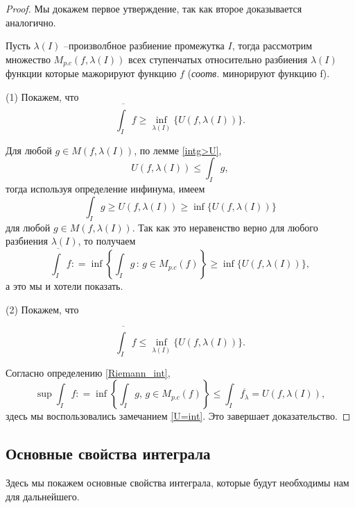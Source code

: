 \begin{proof} Мы докажем первое утверждение, так как второе доказывается аналогично.

Пусть $\lambda(I)$ --произволбное разбиение промежутка $I$, тогда рассмотрим множество $M_{p.c}(f, \lambda(I))$ всех ступенчатых относительно разбиения $\lambda(I)$ функции которые мажорируют функцию $f$ (\textit{соотв.} минорируют функцию f).

(1) Покажем, что 
\[
 \overline{\int_I} f \ge \inf_{\lambda(I)} \{U(f, \lambda(I))\}.
\]

Для любой $g\in M(f, \lambda(I))$, по лемме \ref{intg>U}, 
 \[
   U(f, \lambda(I)) \le \int_I g,
 \]
тогда используя определение инфинума, имеем
\[
 \int_I g \ge U(f,\lambda(I)) \ge \inf\{U(f,\lambda(I))\}
\]
для любой $g\in M(f, \lambda(I))$. Так как это неравенство верно для любого разбиения $\lambda(I)$, то получаем
\[
\overline{\int_I} f: = \inf \left\{ \int_I g\, :\, g \in M_{p.c}(f) \right\} \ge \inf\{U(f,\lambda(I))\},
\]
а это мы и хотели показать.

(2) Покажем, что

\[
 \overline{\int_I} f \le \inf_{\lambda(I)} \{U(f, \lambda(I))\}.
\]

Согласно определению \ref{Riemann_int},
\[
\sup\int_I f : = \inf  \left\{ \int_I g  , \, g \in M_{p.c}(f)\right\} \le \int_I \overline{f_\lambda} = U(f,\lambda(I)),
\]
здесь мы воспользовались замечанием \ref{U=int}. Это завершает доказательство.
\end{proof}

\subsection{Основные свойства интеграла}

Здесь мы покажем основные свойства интеграла, которые будут необходимы нам для дальнейшего.

